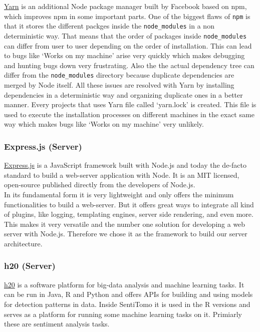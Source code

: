 \documentclass[]{article}
\begin{document}
\href{https://yarnpkg.com/lang/en/}{Yarn} is an additional Node package
manager built by Facebook based on npm, which improves npm in some
important parts. One of the biggest flaws of \texttt{npm} is that it
stores the different packges inside the \texttt{node\_modules} in a non
deterministic way. That means that the order of packages inside
\texttt{node\_modules} can differ from user to user depending on the
order of installation. This can lead to bugs like `Works on my machine'
arise very quickly which makes debugging and hunting bugs down very
frustrating. Also the the actual dependency tree can differ from the
\texttt{node\_modules} directory because duplicate dependencies are
merged by Node itself. All these issues are resolved with Yarn by
installing dependencies in a deterministic way and organizing duplicate
ones in a better manner. Every projects that uses Yarn file called
`yarn.lock' is created. This file is used to execute the installation
processes on different machines in the exact same way which makes bugs
like `Works on my machine' very unlikely.

\subsubsection{Express.js (Server)}\label{express.js-server}

\href{https://expressjs.com/}{Express.js} is a JavaScript framework
built with Node.js and today the de-facto standard to build a web-server
application with Node. It is an MIT licensed, open-source published
directly from the developers of Node.js.\\
In its fundamental form it is very lightweight and only offers the
minimum functionalities to build a web-server. But it offers great ways
to integrate all kind of plugins, like logging, templating engines,
server side rendering, and even more. This makes it very versatile and
the number one solution for developing a web server with Node.js.
Therefore we chose it as the framework to build our server architecture.

\subsubsection{h20 (Server)}\label{h20-server}

\href{https://www.h2o.ai/}{h20} is a software platform for big-data
analysis and machine learning tasks. It can be run in Java, R and Python
and offers APIs for building and using models for detection patterns in
data. Inside SentiTomo it is used in the R versions and serves as a
platform for running some machine learning tasks on it. Primiarly these
are sentiment analysis tasks.
\end{document}
